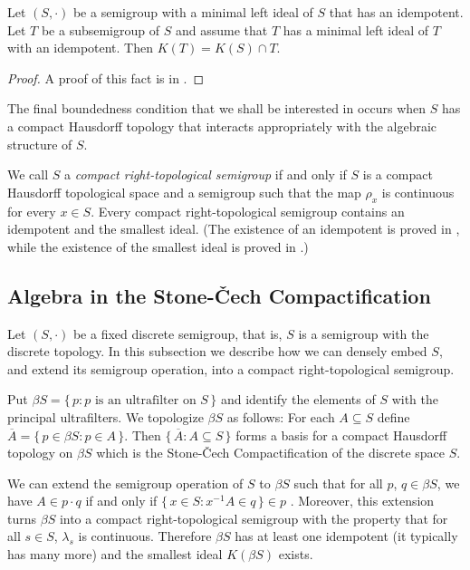 \begin{thm}
  \label{thm:smallest-subsemigrp}
  Let $(S, \cdot)$ be a semigroup with a minimal left ideal of $S$ that has an idempotent. 
  Let $T$ be a subsemigroup of $S$ and assume that $T$ has a minimal left ideal of $T$ with an idempotent.
  Then $K(T) = K(S) \cap T$.
\end{thm}
\begin{proof}
  A proof of this fact is in \cite[Theorem 1.65]{Hindman:1998fk}.
\end{proof}

The final boundedness condition that we shall be interested in occurs when $S$ has a compact Hausdorff topology that interacts appropriately with the algebraic structure of $S$.

We call $S$ a \emph{compact right-topological semigroup} if and only if $S$ is a compact Hausdorff topological space and a semigroup such that the map $\rho_x$ is continuous for every $x \in S$.
Every compact right-topological semigroup contains an idempotent and the smallest ideal.
(The existence of an idempotent is proved in \cite[Theorem 2.5]{Hindman:1998fk}, while the existence of the smallest ideal is proved in \cite[Theorem 2.8]{Hindman:1998fk}.)

\subsection{Algebra in the Stone-\v{C}ech Compactification}
Let $(S, \cdot)$ be a fixed discrete semigroup, that is, $S$ is a semigroup with the discrete topology. 
In this subsection we describe how we can densely embed $S$, and extend its semigroup operation, into a compact right-topological semigroup.

Put $\beta S = \{\, p : \mbox{$p$ is an ultrafilter on $S$} \,\}$ and identify the elements of $S$ with the principal ultrafilters.
We topologize $\beta S$ as follows: For each $A \subseteq S$ define $\overline{A} = \{\, p \in \beta S : p \in A \,\}$.
Then $\{\, \overline{A} : A \subseteq S \,\}$ forms a basis for a compact Hausdorff topology on $\beta S$ which is the Stone-\v{C}ech Compactification \cite[Theorem 3.27]{Hindman:1998fk} of the discrete space $S$.

We can extend the semigroup operation of $S$ to $\beta S$ \cite[Theorem 4.1]{Hindman:1998fk} such that for all $p$, $q \in \beta S$, we have $A \in p \cdot q$ if and only if $\{\, x \in S : x^{-1}A \in q \,\} \in p$ \cite[Theorem 4.12(b)]{Hindman:1998fk}.
Moreover, this extension turns $\beta S$ into a compact right-topological semigroup with the property that for all $s \in S$, $\lambda_s$ is continuous. 
Therefore $\beta S$ has at least one idempotent (it typically has many more) and the smallest ideal $K(\beta S)$ exists. 

